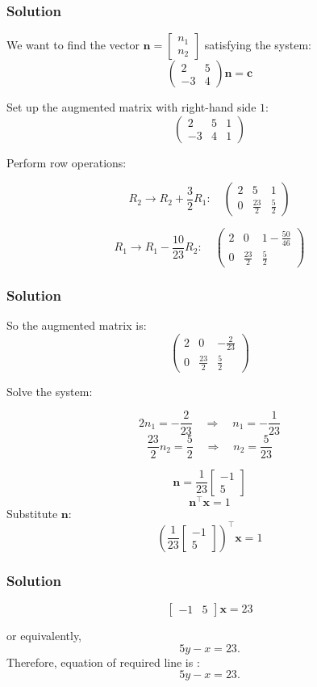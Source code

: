 \documentclass{beamer}
\theoremstyle{remark}
\numberwithin{equation}{section}
\begin{document}
\begin{frame}[fragile]
    \frametitle{Solution}

We want to find the vector \( \mathbf{n} = \begin{bmatrix} n_1 \\ n_2 \end{bmatrix} \) satisfying the system:
\[
\begin{pmatrix}
2 & 5 \\
-3 & 4
\end{pmatrix} \mathbf{n} = \mathbf{c}
\]

Set up the augmented matrix with right-hand side \(1\):
\[
\left(\begin{array}{cc|c}
2 & 5 & 1 \\
-3 & 4 & 1
\end{array}\right)
\]

Perform row operations:

\[
R_2 \to R_2 + \frac{3}{2} R_1:
\quad
\left(\begin{array}{cc|c}
2 & 5 & 1 \\
0 & \frac{23}{2} & \frac{5}{2}
\end{array}\right)
\]

\[
R_1 \to R_1 - \frac{10}{23} R_2:
\quad
\left(\begin{array}{cc|c}
2 & 0 & 1 - \frac{50}{46} \\
0 & \frac{23}{2} & \frac{5}{2}
\end{array}\right)
\]


\end{frame}
\begin{frame}[fragile]
    \frametitle{Solution}

So the augmented matrix is:
\[
\left(\begin{array}{cc|c}
2 & 0 & -\frac{2}{23} \\
0 & \frac{23}{2} & \frac{5}{2}
\end{array}\right)
\]

Solve the system:

\[
2 n_1 = -\frac{2}{23} \quad \Rightarrow \quad n_1 = -\frac{1}{23}
\]
\[
\frac{23}{2} n_2 = \frac{5}{2} \quad \Rightarrow \quad n_2 = \frac{5}{23}
\]

\[
\mathbf{n} = \frac{1}{23}\begin{bmatrix} -1 \\ 5 \end{bmatrix}
\]
\[
\mathbf{n}^\top \mathbf{x} = 1
\]
Substitute \( \mathbf{n} \):
\[
\left(
\frac{1}{23}
\begin{bmatrix}
-1 \\ 5
\end{bmatrix}
\right)^\top
\mathbf{x} = 1
\]

\end{frame}
\begin{frame}[fragile]
    \frametitle{Solution}

\[
\begin{bmatrix}
-1 & 5
\end{bmatrix}
\mathbf{x} = 23
\]


or equivalently,
\[
5y - x = 23.
\]
Therefore, equation of required line is  :\[
\boxed{5y - x = 23.}
\]

\end{frame}
\end{document}
